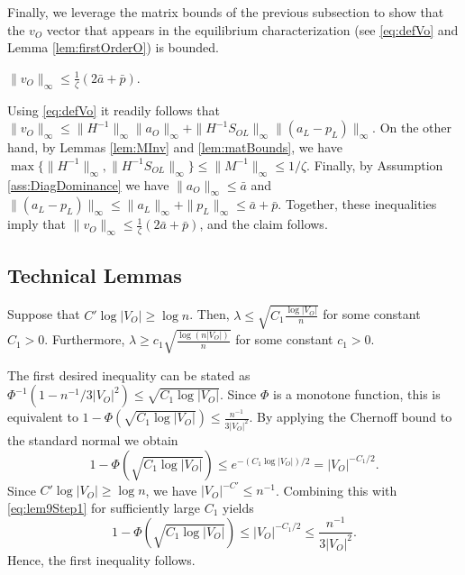 \documentclass[opre,nonblindrev]{informs3} %
\begin{document}
\begin{APPENDIX}{}
 	Finally, we leverage the matrix bounds of the previous subsection to show that
the 	${v}_O$
 	vector that appears in the equilibrium characterization (see
 	\eqref{eq:defVo} and 
 	 Lemma \ref{lem:firstOrderO}) is bounded. 
 	\begin{lemma}\label{lem:boundVo}
 		$\|{v}_O\|_\infty \leq  \frac{1}{\zeta} (2\bar{a}+\bar{p})$.
 	\end{lemma}
 	Using \eqref{eq:defVo} it readily follows that
 	$\|{v}_O\|_\infty \leq \|H^{-1}\|_\infty   \|{a}_O\|_\infty + \|H^{-1} S_{OL}\|_\infty \|({a}_L -{p}_L) \|_\infty$.
 	On the other hand, by Lemmas \ref{lem:MInv} and \ref{lem:matBounds},
 	we have
 	$\max\{\|H^{-1}\|_\infty ,  \|H^{-1} S_{OL}\|_\infty\}
 	\leq \|M^{-1}\|_\infty \leq 1/\zeta$.
 	Finally,
 	by Assumption \ref{ass:DiagDominance} we have
 	$\|{a}_O\|_\infty \leq \bar{a}$ and
 	$\|({a}_L -{p}_L) \|_\infty \leq \|{a}_L \|_\infty+ \|{p}_L\|_\infty \leq \bar{a} +\bar{p}$.
 	Together, these inequalities imply that
 	$\|{v}_O\|_\infty \leq  \frac{1}{\zeta} (2\bar{a}+\bar{p})$, and the claim follows. \hfill \halmos
 	\endproof	
 	
 	
 	\subsection{Technical Lemmas} \label{subse:probalisticResults}
 	
 	
 
 	\begin{lemma} \label{lem:lambdaScale}
 		Suppose that $C' \log |V_O| \geq \log n$. Then,
 		$\lambda \leq  \sqrt{  C_1 \frac{\log |V_O|}{n}}$ for some constant $C_1 >0$. 
 		{Furthermore,
 			$\lambda \geq c_1 \sqrt{\frac{ \log(n|V_O|)}{n}}$ for some constant $c_1>0$.}
 	\end{lemma}
 	The first desired inequality can be stated as
 	$\Phi^{-1}(1-n^{-1}/3|V_O|^2) \leq \sqrt{C_1  \log{|V_O|}}$.
 	Since $\Phi$ is a monotone function, this is equivalent to
 	$1-\Phi( \sqrt{C_1 \log{|V_O|}})\leq \frac{n^{-1}}{3|V_O|^2}$.
 	By applying the Chernoff bound  to the standard normal
 	we obtain
 	\begin{equation}\label{eq:lem9Step1}
 	1-\Phi(\sqrt{C_1\log{|V_O|}}) \leq e^{-(C_1\log|V_O|)/2} =
 	|V_O|^{-C_1/2}.
 	\end{equation}
 	Since
 	$C' \log |V_O| \geq \log n$, we have $|V_O|^{-C'} \leq n^{-1}$. Combining this with \eqref{eq:lem9Step1} for sufficiently large $C_1$  yields
 	$$1-\Phi(\sqrt{C_1 \log{|V_O|}}) \leq
 	|V_O|^{-C_1/2} \leq
 	\frac{n^{-1}}{3|V_O|^2}
 	. $$
 	Hence, the first inequality follows.
 	

\end{APPENDIX}
\end{document}
